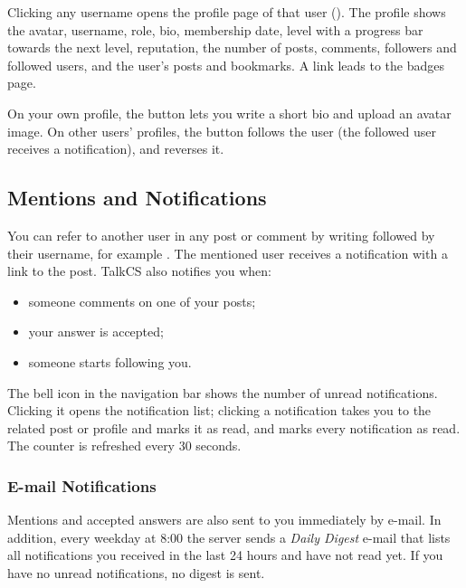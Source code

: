 Clicking any username opens the profile page of that user ().
The profile shows the avatar, username, role, bio, membership date, level with a
progress bar towards the next level, reputation, the number of posts, comments,
followers and followed users, and the user's posts and bookmarks. A link leads to the
badges page.

On your own profile, the  button lets you write a short bio and upload
an avatar image. On other users' profiles, the  button follows the user
(the followed user receives a notification), and  reverses it.


\subsection{Mentions and Notifications}
\label{sec:guide-notifications}

You can refer to another user in any post or comment by writing  followed by
their username, for example . The mentioned user receives a notification
with a link to the post. TalkCS also notifies you when:

\begin{itemize}
  \item someone comments on one of your posts;
  \item your answer is accepted;
  \item someone starts following you.
\end{itemize}

The bell icon in the navigation bar shows the number of unread notifications. Clicking
it opens the notification list; clicking a notification takes you to the related post
or profile and marks it as read, and  marks every notification as
read. The counter is refreshed every 30 seconds.

\subsubsection*{E-mail Notifications}

Mentions and accepted answers are also sent to you immediately by e-mail. In addition,
every weekday at 8:00 the server sends a \emph{Daily Digest} e-mail that lists all
notifications you received in the last 24 hours and have not read yet. If you have no
unread notifications, no digest is sent.


